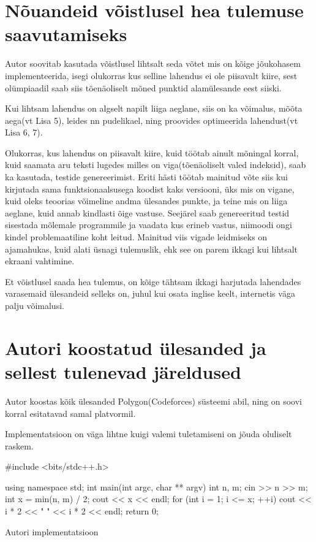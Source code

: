 \documentclass{trkut}
\theoremstyle{definition}
\begin{document}
\section{Nõuandeid võistlusel hea tulemuse saavutamiseks}
Autor soovitab kasutada võistlusel lihtsalt seda võtet mis on kõige jõukohasem implementeerida, isegi olukorras kus selline lahendus ei ole piisavalt kiire, sest olümpiaadil saab siis tõenäoliselt mõned punktid alamülesande eest siiski.

Kui lihtsam lahendus on algselt napilt liiga aeglane, siis on ka võimalus, mõõta aega(vt Lisa 5), leides nn pudelikael, ning proovides optimeerida lahendust(vt Lisa 6, 7).

Olukorras, kus lahendus on piisavalt kiire, kuid töötab ainult mõningal korral, kuid saamata aru teksti lugedes milles on viga(tõenäoliselt valed indeksid), saab ka kasutada, testide genereerimist. Eriti hästi töötab mainitud võte siis kui kirjutada sama funktsionaalsusega koodist kaks versiooni, üks mis on vigane, kuid oleks teoorias võimeline andma ülesandes punkte, ja teine mis on liiga aeglane, kuid annab kindlasti õige vastuse. Seejärel saab genereeritud testid sisestada mõlemale programmile ja vaadata kus erineb vastus, niimoodi ongi kindel problemaatiline koht leitud.
Mainitud viis vigade leidmiseks on ajamahukas, kuid alati üsnagi tulemuslik, ehk see on parem ikkagi kui lihtsalt ekraani vahtimine.

Et võistlusel saada hea tulemus, on kõige tähtsam ikkagi harjutada lahendades varasemaid ülesandeid selleks on, juhul kui osata inglise keelt, internetis väga palju võimalusi.
\section{Autori koostatud ülesanded ja sellest tulenevad järeldused}

Autor koostas kõik ülesanded Polygon(Codeforces) süsteemi abil, ning on soovi korral esitatavad samal platvormil.




Implementatsioon on väga lihtne kuigi valemi tuletamiseni on jõuda oluliselt raskem.
    \begin{cclol}
 #include <bits/stdc++.h>

 using namespace std;
 int main(int argc, char ** argv) {
   int n, m;
   cin >> n >> m;
   int x = min(n, m) / 2;
   cout << x << endl;
   for (int i = 1; i <= x; ++i) {
     cout << i * 2 << " " << i * 2 << endl;
   }
   return 0;
 }
    \end{cclol}
    \begin{kk}[H]%
    \caption{Autori implementatsioon}%
    \label{mkm}%
    \end{kk}
\end{document}
